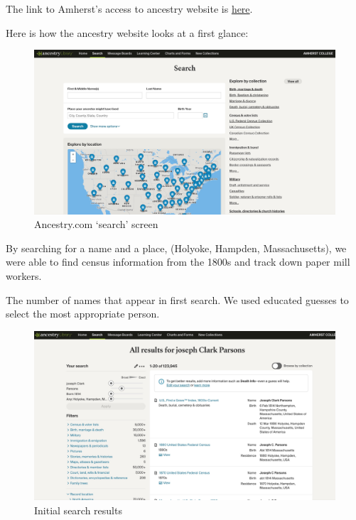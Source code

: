 \documentclass[
  letterpaper,
  DIV=11,
  numbers=noendperiod]{scrartcl}
\begin{document}
The link to Amherst's access to ancestry website is
\href{https://libguides.amherst.edu/c.php?g=944984\&p=6812570}{here}.

Here is how the ancestry website looks at a first glance:

\begin{figure}

{\centering \includegraphics[width=\textwidth,height=0.325\textheight]{website.jpeg}

}

\caption{\label{fig-sample2}Ancestry.com `search' screen}

\end{figure}

By searching for a name and a place, (Holyoke, Hampden, Massachusetts),
we were able to find census information from the 1800s and track down
paper mill workers.

The number of names that appear in first search. We used educated
guesses to select the most appropriate person.

\begin{figure}

{\centering \includegraphics[width=\textwidth,height=0.33\textheight]{multiple_names.jpeg}

}

\caption{\label{fig-sample3}Initial search results}

\end{figure}
\end{document}

